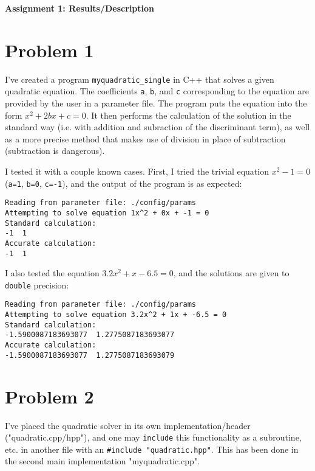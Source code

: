 \documentclass[12pt]{article}
\begin{document}
\begin{center}\begin{LARGE}
\textbf{Assignment 1: Results/Description}
\end{LARGE}\end{center}

\section*{Problem 1}

I've created a program \texttt{myquadratic_single} in C++ that solves a given
quadratic equation. The coefficients \texttt{a}, \texttt{b}, and \texttt{c}
corresponding to the equation are provided by the user in a parameter file. The
program puts the equation into the form $x^2 + 2bx + c = 0$. It then performs
the calculation of the solution in the standard way (i.e. with addition and
subraction of the discriminant term), as well as a more precise method that
makes use of division in place of subtraction (subtraction is dangerous).

I tested it with a couple known cases. First, I tried the trivial equation
$x^2 - 1 = 0$ (\texttt{a=1}, \texttt{b=0}, \texttt{c=-1}), and the output of
the program is as expected:
\begin{verbatim}
Reading from parameter file: ./config/params
Attempting to solve equation 1x^2 + 0x + -1 = 0
Standard calculation:
-1  1
Accurate calculation:
-1  1
\end{verbatim}

I also tested the equation $3.2x^2 + x - 6.5 = 0$, and the solutions are given to
\texttt{double} precision:
\begin{verbatim}
Reading from parameter file: ./config/params
Attempting to solve equation 3.2x^2 + 1x + -6.5 = 0
Standard calculation:
-1.5900087183693077  1.2775087183693077
Accurate calculation:
-1.5900087183693077  1.2775087183693079
\end{verbatim}

\section*{Problem 2}

I've placed the quadratic solver in its own implementation/header ("quadratic.cpp/hpp"),
and one may \texttt{include} this functionality as a subroutine, etc. in another
file with an \texttt{\#include "quadratic.hpp"}. This has been done in the second main
implementation "myquadratic.cpp".
\end{document}
